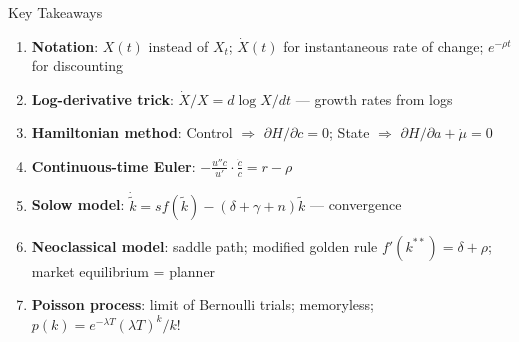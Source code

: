 \documentclass[blue]{beamer}
\begin{document}
\begin{frame}{Key Takeaways}
	\begin{enumerate}
		\item \textbf{Notation}: $X(t)$ instead of $X_t$; $\dot{X}(t)$ for instantaneous rate of change; $e^{-\rho t}$ for discounting
		
		\item \textbf{Log-derivative trick}: $\dot{X}/X = d\log X/dt$ --- growth rates from logs
		
		\item \textbf{Hamiltonian method}: Control $\Rightarrow$ $\partial H/\partial c = 0$; State $\Rightarrow$ $\partial H/\partial a + \dot{\mu} = 0$
		
		\item \textbf{Continuous-time Euler}: $-\frac{u''c}{u'} \cdot \frac{\dot{c}}{c} = r - \rho$
		
		\item \textbf{Solow model}: $\dot{\tilde{k}} = sf(\tilde{k}) - (\delta+\gamma+n)\tilde{k}$ --- convergence
		
		\item \textbf{Neoclassical model}: saddle path; modified golden rule $f'(k^{**}) = \delta + \rho$; market equilibrium = planner
		
		\item \textbf{Poisson process}: limit of Bernoulli trials; memoryless; $p(k) = e^{-\lambda T}(\lambda T)^k/k!$
	\end{enumerate}
\end{frame}
\end{document}
